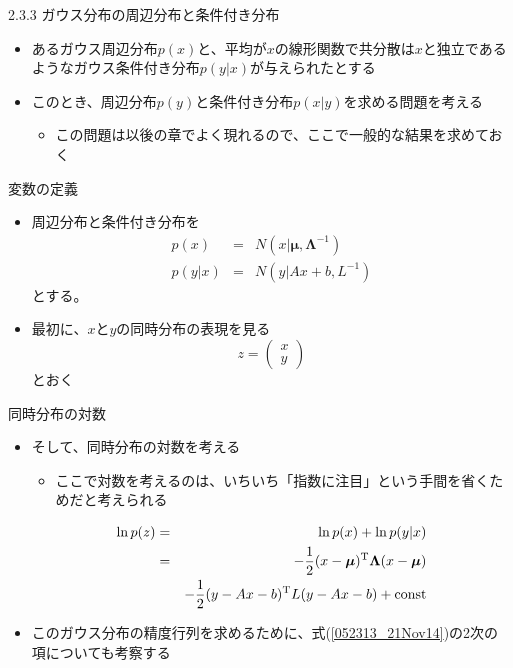 \begin{frame}{2.3.3 ガウス分布の周辺分布と条件付き分布}
 \begin{itemize}
  \item あるガウス周辺分布$p(x)$と、平均が$x$の線形関数で共分散は$x$と独立であるようなガウス条件付き分布$p(y|x)$が与えられたとする
  \item このとき、周辺分布$p(y)$と条件付き分布$p(x|y)$を求める問題を考える
        \begin{itemize}
         \item この問題は以後の章でよく現れるので、ここで一般的な結果を求めておく
        \end{itemize}
 \end{itemize}
\end{frame}

\begin{frame}{変数の定義}
 \begin{itemize}
  \item 周辺分布と条件付き分布を
        \begin{eqnarray}
         p(x) &=& N(x|\bm{\mu} , \bm{\Lambda}^{-1})\\
         p(y|x) &=& N(y|Ax+b, L^{-1})
        \end{eqnarray}
        とする。
  \item 最初に、$x$と$y$の同時分布の表現を見る
        \begin{equation}
         z = \begin{pmatrix}
              x \\
              y
             \end{pmatrix}
        \end{equation}
        とおく
 \end{itemize}
\end{frame}

\begin{frame}{同時分布の対数}
 \begin{itemize}
  \item そして、同時分布の対数を考える
  \begin{itemize}
   \item ここで対数を考えるのは、いちいち「指数に注目」という手間を省くためだと考えられる
  \end{itemize}
        \begin{eqnarray}
         \ln p(z) &=& \ln p(x) + \ln p(y|x) \nonumber \\
         &= & -\frac{1}{2}(x-\bm{\mu})^{\mathrm{T}}\bm{\Lambda}(x-\bm{\mu}) \nonumber \\
         &&-\frac{1}{2}(y-Ax-b)^{\mathrm{T}}L(y-Ax-b)+{\rm const}\label{052313_21Nov14}
        \end{eqnarray}
  \item このガウス分布の精度行列を求めるために、式(\ref{052313_21Nov14})の2次の項についても考察する
 \end{itemize}
\end{frame}

